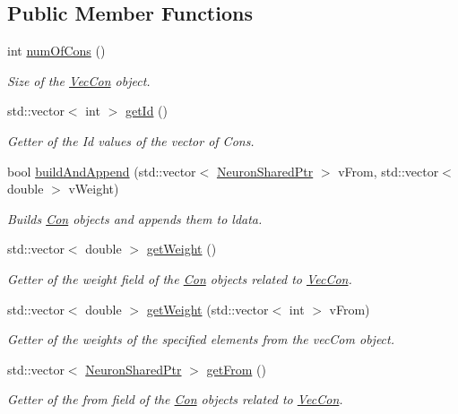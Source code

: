 \subsection*{Public Member Functions}
\begin{DoxyCompactItemize}
\item 
int \hyperlink{classvec_con_a1e39a5e78c40ae8af9bbd2fd7f0dc749}{numOfCons} ()
\begin{DoxyCompactList}\small\item\em Size of the \hyperlink{classvec_con}{VecCon} object. \end{DoxyCompactList}\item 
std::vector$<$ int $>$ \hyperlink{classvec_con_aa9f3f5df4c4060951c975c4c829b8471}{getId} ()
\begin{DoxyCompactList}\small\item\em Getter of the Id values of the vector of Cons. \end{DoxyCompactList}\item 
bool \hyperlink{classvec_con_ae2f2979a6ce42fa5ff0a8911a3ec3cb6}{buildAndAppend} (std::vector$<$ \hyperlink{_a_m_o_r_e_8h_a03051950b0faf9499d14cf376e04c329}{NeuronSharedPtr} $>$ vFrom, std::vector$<$ double $>$ vWeight)
\begin{DoxyCompactList}\small\item\em Builds \hyperlink{class_con}{Con} objects and appends them to ldata. \end{DoxyCompactList}\item 
std::vector$<$ double $>$ \hyperlink{classvec_con_a76f10669494f2247d036ae6a1f296873}{getWeight} ()
\begin{DoxyCompactList}\small\item\em Getter of the weight field of the \hyperlink{class_con}{Con} objects related to \hyperlink{classvec_con}{VecCon}. \end{DoxyCompactList}\item 
std::vector$<$ double $>$ \hyperlink{classvec_con_ac3d4b7b11bfff3407afd585c1ae6a658}{getWeight} (std::vector$<$ int $>$ vFrom)
\begin{DoxyCompactList}\small\item\em Getter of the weights of the specified elements from the vecCom object. \end{DoxyCompactList}\item 
std::vector$<$ \hyperlink{_a_m_o_r_e_8h_a03051950b0faf9499d14cf376e04c329}{NeuronSharedPtr} $>$ \hyperlink{classvec_con_ae72d00aedcd054e690f1dcf2ca5ac2c2}{getFrom} ()
\begin{DoxyCompactList}\small\item\em Getter of the from field of the \hyperlink{class_con}{Con} objects related to \hyperlink{classvec_con}{VecCon}. \end{DoxyCompactList}\item 

\end{DoxyCompactItemize}
